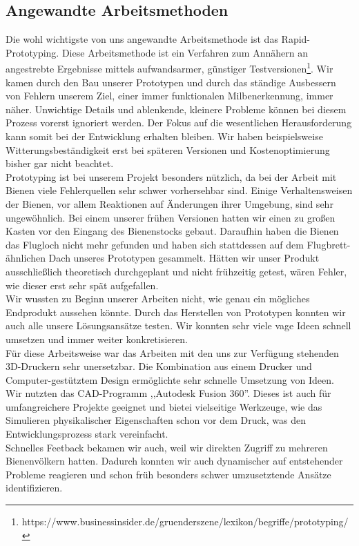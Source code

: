 \documentclass[11pt,a4paper]{article}
\begin{document}
\subsection{Angewandte Arbeitsmethoden}
Die wohl wichtigste von uns angewandte Arbeitsmethode ist das Rapid-Prototyping. Diese Arbeitsmethode ist ein Verfahren zum Annähern an angestrebte Ergebnisse mittels aufwandsarmer, günstiger Testversionen\footnote{https://www.businessinsider.de/gruenderszene/lexikon/begriffe/prototyping/}. Wir kamen durch den Bau unserer Prototypen und durch das ständige Ausbessern von Fehlern unserem Ziel, einer immer funktionalen Milbenerkennung, immer näher. Unwichtige Details und ablenkende, kleinere Probleme können bei diesem Prozess vorerst ignoriert werden. Der Fokus auf die wesentlichen Herausforderung kann somit bei der Entwicklung erhalten bleiben. Wir haben beispielsweise Witterungsbeständigkeit erst bei späteren Versionen und Kostenoptimierung bisher gar nicht beachtet.\\
Prototyping ist bei unserem Projekt besonders nützlich, da bei der Arbeit mit Bienen viele Fehlerquellen sehr schwer vorhersehbar sind. Einige Verhaltensweisen der Bienen, vor allem Reaktionen auf Änderungen ihrer Umgebung, sind sehr ungewöhnlich. Bei einem unserer frühen Versionen hatten wir einen zu großen Kasten vor den Eingang des Bienenstocks gebaut. Daraufhin haben die Bienen das Flugloch nicht mehr gefunden und haben sich stattdessen auf dem Flugbrett-ähnlichen Dach unseres Prototypen gesammelt. Hätten wir unser Produkt ausschließlich theoretisch durchgeplant und nicht frühzeitig getest, wären Fehler, wie dieser erst sehr spät aufgefallen.\\
Wir wussten zu Beginn unserer Arbeiten nicht, wie genau ein mögliches Endprodukt aussehen könnte. Durch das Herstellen von Prototypen konnten wir auch alle unsere Lösungsansätze testen. Wir konnten sehr viele vage Ideen schnell umsetzen und immer weiter konkretisieren.\\
Für diese Arbeitsweise war das Arbeiten mit den uns zur Verfügung stehenden 3D-Druckern sehr unersetzbar. Die Kombination aus einem Drucker und Computer-gestütztem Design ermöglichte sehr schnelle Umsetzung von Ideen. Wir nutzten das CAD-Programm ,,Autodesk Fusion 360''. Dieses ist auch für umfangreichere Projekte geeignet und bietei vielseitige Werkzeuge, wie das Simulieren physikalischer Eigenschaften schon vor dem Druck, was den Entwicklungsprozess stark vereinfacht. \\
Schnelles Feetback bekamen wir auch, weil wir direkten Zugriff zu mehreren Bienenvölkern hatten. Dadurch konnten wir auch dynamischer auf entstehender Probleme reagieren und schon früh besonders schwer umzusetztende Ansätze identifizieren.
\end{document}
